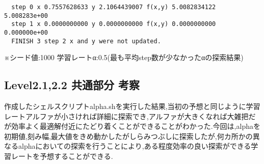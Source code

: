   \begin{lstlisting}[caption=探索プログラム実行結果,label=ラベル]
  %./steepest_decent2_2 1000 
  step 0 x 0.7557628633 y 2.1064439007 f(x,y) 5.0082834122 5.008283e+00
  step 1 x 0.0000000000 y 0.0000000000 f(x,y) 0.0000000000 0.000000e+00
  FINISH 3 step 2 x and y were not updated.
  \end{lstlisting}
  ※シード値:1000 学習レートα:0.5(最も平均step数が少なかったαの探索結果)

\subsection{Level2.1,2.2 共通部分 考察}

作成したシェルスクリプトalpha.shを実行した結果,当初の予想と同じように学習レートアルファが小さければ詳細に探索でき,アルファが大きくなれば大雑把だが効率よく最適解付近にたどり着くことができることがわかった.今回は,alphaを初期値,刻み幅,最大値をきめ動かしたがしらみつぶしに探索したが,何カ所かの異なるalphaにおいての探索を行うことにより,ある程度効率の良い探索ができる学習レートを予想することができる.
